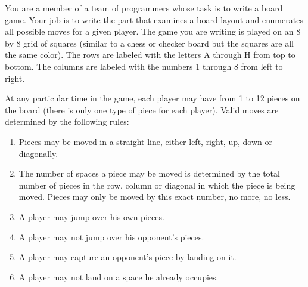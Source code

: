 


\pagestyle{contest}


\maketitle


You are a member of a team of programmers whose task is to write a
board game.  Your job is to write the part that examines a board
layout and enumerates all possible moves for a given player.  The game
you are writing is played on an 8 by 8 grid of squares (similar to a
chess or checker board but the squares are all the same color).  The
rows are labeled with the letters A through H from top to bottom.  The
columns are labeled with the numbers 1 through 8 from left to right.

At any particular time in the game, each player may have from 1 to 12
pieces on the board (there is only one type of piece for each player).
Valid moves are determined by the following rules:

\begin{enumerate}

\item Pieces may be moved in a straight line, either left, right, up,
down or diagonally.

\item The number of spaces a piece may be moved is determined by the
total number of pieces in the row, column or diagonal in which the
piece is being moved.  Pieces may only be moved by this exact number,
no more, no less.

\item A player may jump over his own pieces.

\item A player may not jump over his opponent's pieces.

\item A player may capture an opponent's piece by landing on it.

\item A player may not land on a space he already occupies.

\end{enumerate}

